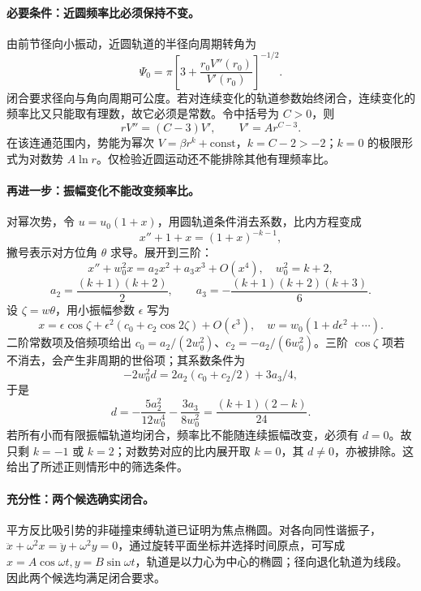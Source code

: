 \paragraph{必要条件：近圆频率比必须保持不变。}
由前节径向小振动，近圆轨道的半径向周期转角为
\begin{equation}\label{eq:apsidal-angle}
\Psi_0=\pi\left[3+\frac{r_0V''(r_0)}{V'(r_0)}\right]^{-1/2}.
\end{equation}
闭合要求径向与角向周期可公度。若对连续变化的轨道参数始终闭合，连续变化的频率比又只能取有理数，故它必须是常数。令中括号为 $C>0$，则
\[
rV''=(C-3)V',\qquad V'=A r^{C-3}.
\]
在该连通范围内，势能为幂次 $V=\beta r^k+\mathrm{const}$，$k=C-2>-2$；$k=0$ 的极限形式为对数势 $A\ln r$。仅检验近圆运动还不能排除其他有理频率比。

\paragraph{再进一步：振幅变化不能改变频率比。}
对幂次势，令 $u=u_0(1+x)$，用圆轨道条件消去系数，比内方程变成
\[
x''+1+x=(1+x)^{-k-1},
\]
撇号表示对方位角 $\theta$ 求导。展开到三阶：
\[
x''+w_0^2x=a_2x^2+a_3x^3+O(x^4),\quad
w_0^2=k+2,
\]
\[
a_2=\frac{(k+1)(k+2)}2,\qquad
a_3=-\frac{(k+1)(k+2)(k+3)}6.
\]
设 $\zeta=w\theta$，用小振幅参数 $\epsilon$ 写为
\[
x=\epsilon\cos\zeta+\epsilon^2(c_0+c_2\cos2\zeta)+O(\epsilon^3),\quad
w=w_0(1+d\epsilon^2+\cdots).
\]
二阶常数项及倍频项给出 $c_0=a_2/(2w_0^2)$、$c_2=-a_2/(6w_0^2)$。三阶 $\cos\zeta$ 项若不消去，会产生非周期的世俗项；其系数条件为
\[
-2w_0^2d=2a_2(c_0+c_2/2)+3a_3/4,
\]
于是
\[
d=-\frac{5a_2^2}{12w_0^4}-\frac{3a_3}{8w_0^2}
=\frac{(k+1)(2-k)}{24}.
\]
若所有小而有限振幅轨道均闭合，频率比不能随连续振幅改变，必须有 $d=0$。故只剩 $k=-1$ 或 $k=2$；对数势对应的比内展开取 $k=0$，其 $d\ne0$，亦被排除。这给出了所述正则情形中的筛选条件。

\paragraph{充分性：两个候选确实闭合。}
平方反比吸引势的非碰撞束缚轨道已证明为焦点椭圆。对各向同性谐振子，$\ddot x+\omega^2x=\ddot y+\omega^2y=0$，通过旋转平面坐标并选择时间原点，可写成 $x=A\cos\omega t,y=B\sin\omega t$，轨道是以力心为中心的椭圆；径向退化轨道为线段。因此两个候选均满足闭合要求。

